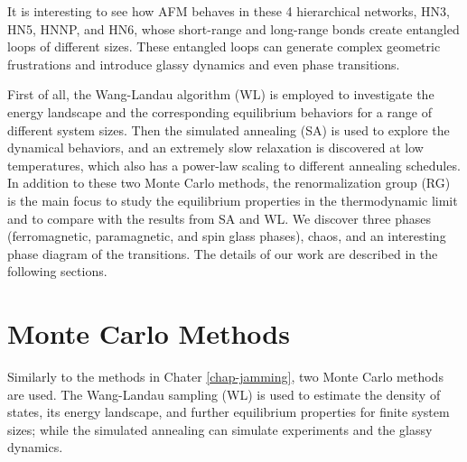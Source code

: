 It is interesting to see how AFM behaves in these 4 hierarchical networks, HN3, HN5, HNNP, and HN6, whose short-range and long-range bonds create entangled loops of different sizes. These entangled loops can generate complex geometric frustrations and introduce glassy dynamics and even phase transitions. 

First of all,  the Wang-Landau algorithm (WL) is employed to investigate the energy landscape and the corresponding equilibrium behaviors for a range of different system sizes. Then the simulated annealing (SA) is used to explore the dynamical behaviors, and an extremely slow relaxation is discovered at low temperatures, which also has a power-law scaling to different annealing schedules.  In addition to these two Monte Carlo methods, the renormalization group (RG) is the main focus to study the equilibrium properties in the thermodynamic limit and to compare with the results from SA and WL. We discover three phases (ferromagnetic, paramagnetic, and spin glass phases), chaos, and an interesting phase diagram of the transitions. The details of our work are described in the following sections.


\section{Monte Carlo Methods}
\label{sec:afm-mc}
Similarly to the methods in Chater \ref{chap-jamming}, two Monte Carlo methods are used. The Wang-Landau sampling (WL) is used to estimate the density of states, its energy landscape, and further equilibrium properties for finite system sizes; while  the simulated annealing can simulate experiments and the glassy dynamics.
 
